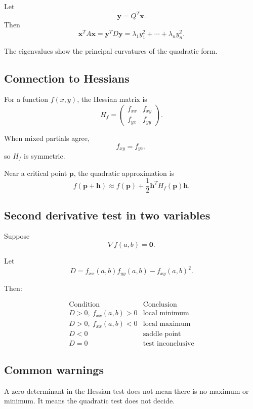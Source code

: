 Let
\[
    \mathbf y=Q^T\mathbf x.
\]
Then
\[
\boxed{
    \mathbf x^T A\mathbf x
    =
    \mathbf y^T D\mathbf y
    =
    \lambda_1 y_1^2+\cdots+\lambda_n y_n^2.
}
\]

The eigenvalues show the principal curvatures of the quadratic form.

\subsection*{Connection to Hessians}

For a function \(f(x,y)\), the Hessian matrix is
\[
\boxed{
    H_f=
    \begin{pmatrix}
    f_{xx} & f_{xy}\\
    f_{yx} & f_{yy}
    \end{pmatrix}.
}
\]

When mixed partials agree,
\[
    f_{xy}=f_{yx},
\]
so \(H_f\) is symmetric.

Near a critical point \(\mathbf p\), the quadratic approximation is
\[
\boxed{
    f(\mathbf p+\mathbf h)
    \approx
    f(\mathbf p)
    +
    \frac12\mathbf h^T H_f(\mathbf p)\mathbf h.
}
\]

\subsection*{Second derivative test in two variables}

Suppose
\[
    \nabla f(a,b)=\mathbf 0.
\]

Let
\[
\boxed{
    D=f_{xx}(a,b)f_{yy}(a,b)-f_{xy}(a,b)^2.
}
\]

Then:

\[
\begin{array}{c|c}
\text{Condition} & \text{Conclusion} \\ \hline
D>0,\ f_{xx}(a,b)>0 & \text{local minimum}\\[1mm]
D>0,\ f_{xx}(a,b)<0 & \text{local maximum}\\[1mm]
D<0 & \text{saddle point}\\[1mm]
D=0 & \text{test inconclusive}
\end{array}
\]

\subsection*{Common warnings}

A zero determinant in the Hessian test does not mean there is no maximum or minimum.
It means the quadratic test does not decide.

